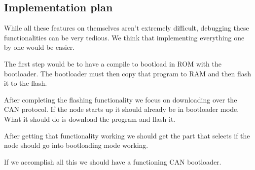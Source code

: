 \documentclass[twocolumn]{article}
\begin{document}
	\subsection*{Implementation plan}
		While all these features on themselves aren't extremely difficult, debugging these functionalities can be very tedious.
		We think that implementing everything one by one would be easier.
		
		The first step would be to have a compile to bootload in ROM with the bootloader.
		The bootloader must then copy that program to RAM and then flash it to the flash.
		
		After completing the flashing functionality we focus on downloading over the CAN protocol.
		If the node starts up it should already be in bootloader mode.
		What it should do is download the program and flash it.
		
		After getting that functionality working we should get the part that selects if the node should go into bootloading mode working.
		
		If we accomplish all this we should have a functioning CAN bootloader.
\end{document}
